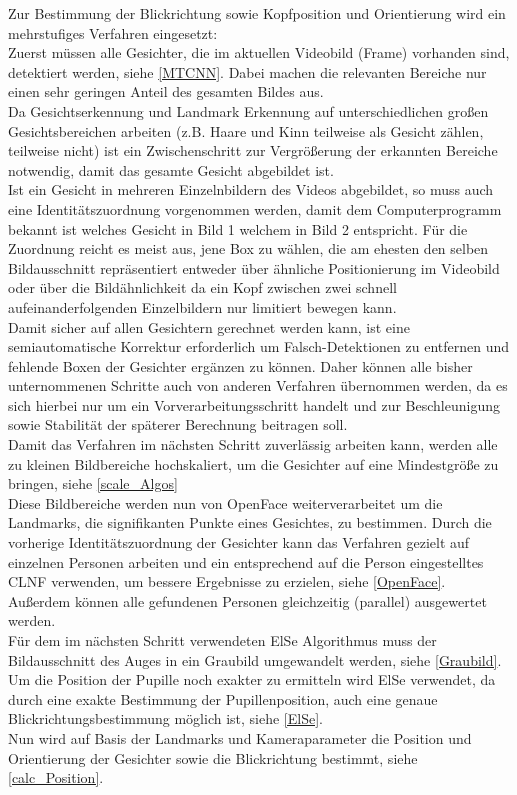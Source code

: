\label{Implementierung_Ablauf}

Zur Bestimmung der Blickrichtung sowie Kopfposition und Orientierung wird ein mehrstufiges Verfahren eingesetzt:\\
Zuerst müssen alle Gesichter, die im aktuellen Videobild (Frame) vorhanden sind, detektiert werden, siehe \autoref{MTCNN}. Dabei machen die relevanten Bereiche nur einen sehr geringen Anteil des gesamten Bildes aus.\\
Da Gesichtserkennung und Landmark Erkennung auf unterschiedlichen großen Gesichtsbereichen arbeiten (z.B. Haare und Kinn teilweise als Gesicht zählen, teilweise nicht) ist ein Zwischenschritt zur Vergrößerung der erkannten Bereiche notwendig, damit das gesamte Gesicht abgebildet ist.\\
Ist ein Gesicht in mehreren Einzelnbildern des Videos abgebildet, so muss auch eine Identitätszuordnung vorgenommen werden, damit dem Computerprogramm bekannt ist welches Gesicht in Bild 1 welchem in Bild 2 entspricht. Für die Zuordnung reicht es meist aus, jene Box zu wählen, die am ehesten den selben Bildausschnitt repräsentiert entweder über ähnliche Positionierung im Videobild oder über die Bildähnlichkeit da ein Kopf zwischen zwei schnell aufeinanderfolgenden Einzelbildern nur limitiert bewegen kann.\\
Damit sicher auf allen Gesichtern gerechnet werden kann, ist eine semiautomatische Korrektur erforderlich um Falsch-Detektionen zu entfernen und fehlende Boxen der Gesichter ergänzen zu können. Daher können alle bisher unternommenen Schritte auch von anderen Verfahren übernommen werden, da es sich hierbei nur um ein Vorverarbeitungsschritt handelt und zur Beschleunigung sowie Stabilität der späterer Berechnung beitragen soll.\\
Damit das Verfahren im nächsten Schritt zuverlässig arbeiten kann, werden alle zu kleinen Bildbereiche hochskaliert, um die Gesichter auf eine Mindestgröße zu bringen, siehe \autoref{scale_Algos}\\
Diese Bildbereiche werden nun von OpenFace weiterverarbeitet um die Landmarks, die signifikanten Punkte eines Gesichtes, zu bestimmen. Durch die vorherige Identitätszuordnung der Gesichter kann das Verfahren gezielt auf einzelnen Personen arbeiten und ein entsprechend auf die Person eingestelltes CLNF verwenden, um bessere Ergebnisse zu erzielen, siehe \autoref{OpenFace}. Außerdem können alle gefundenen Personen gleichzeitig (parallel) ausgewertet werden.\\
Für dem im nächsten Schritt verwendeten ElSe Algorithmus muss der Bildausschnitt des Auges in ein Graubild umgewandelt werden, siehe \autoref{Graubild}.\\
Um die Position der Pupille noch exakter zu ermitteln wird ElSe verwendet, da durch eine exakte Bestimmung der Pupillenposition, auch eine genaue Blickrichtungsbestimmung möglich ist, siehe \autoref{ElSe}.\\
Nun wird auf Basis der Landmarks und Kameraparameter die Position und Orientierung der Gesichter sowie die Blickrichtung bestimmt, siehe \autoref{calc_Position}.